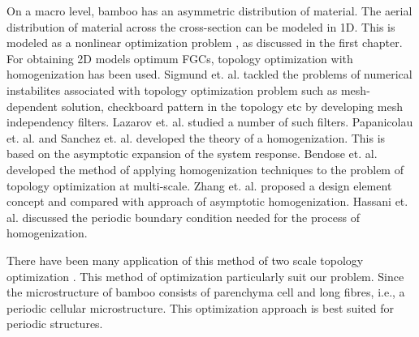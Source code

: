 \documentclass[openright,twoside]{iitkthesis}
\begin{document}
On a macro level, bamboo has an asymmetric distribution of material\cite{habibi2015asymmetric}. The aerial distribution of material across the cross-section can be modeled in 1D. This is modeled as a nonlinear optimization problem \cite{svanberg2007mma}, as discussed in the first chapter.
For obtaining 2D models optimum FGCs, topology optimization\cite{bendsoe2009topology} with homogenization has been used. Sigmund et. al. \cite{sigmund1998numerical} tackled the problems of numerical instabilites associated with topology optimization problem such as mesh-dependent solution, checkboard pattern in the topology etc by developing mesh independency filters. Lazarov et. al. \cite{lazarov2011filters} studied a number of such filters. Papanicolau et. al. \cite{papanicolau1978asymptotic} and Sanchez et. al. \cite{sanchez1980non} developed the theory of a homogenization. This is based on the asymptotic expansion of the system response. Bendose et. al. \cite{bendsoe1988generating} developed the method of applying homogenization techniques to the problem of topology optimization at multi-scale. Zhang et. al. \cite{zhang2006scale} proposed a design element concept and compared with approach of asymptotic homogenization. Hassani et. al. \cite{hassani1998review} discussed the periodic boundary condition needed for the process of homogenization. \par 
There have been many application of this method of two scale topology optimization \cite{huang2015topology}\cite{huang2011topological}\cite{niu2009optimum}. This method of optimization particularly suit our problem. Since the microstructure of bamboo consists of parenchyma cell and long fibres, i.e., a periodic cellular microstructure. This optimization approach is best suited for periodic structures. 
\newpage
\end{document}
